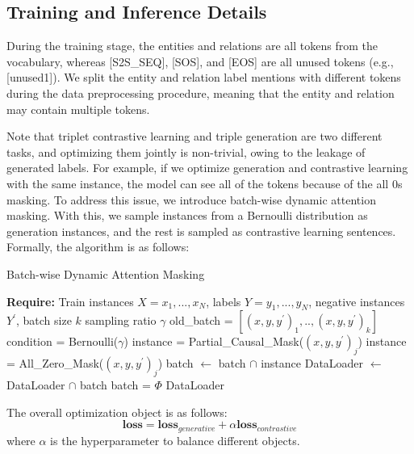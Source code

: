 \documentclass[letterpaper]{article} \usepackage{aaai21}  \usepackage{times}  \usepackage{helvet} \usepackage{courier}  \usepackage[hyphens]{url}  \usepackage{graphicx} \urlstyle{rm} \def\UrlFont{\rm}  \usepackage{natbib}  \usepackage[noend]{algpseudocode}
\begin{document}
\subsection{Training and Inference Details}

During the training stage, the entities and relations are all tokens from the vocabulary, whereas [S2S\_SEQ], [SOS], and [EOS] are all unused tokens (e.g., [unused1]). We split the entity and relation label mentions with different tokens during the data preprocessing procedure, meaning that the entity and relation may contain multiple tokens. 

Note that triplet contrastive learning and triple generation are two different tasks, and optimizing them jointly is non-trivial, owing to the leakage of generated labels. For example, if we optimize generation and contrastive learning with the same instance, the model can see all of the tokens because of the all $0$s masking. To address this issue, we introduce batch-wise dynamic attention masking. With this, we sample instances from a Bernoulli distribution as generation instances, and the rest is sampled as contrastive learning sentences. Formally, the algorithm is as follows:

\begin{algorithm}[th]
\begin{algorithmic}[1]
\caption{Batch-wise  Dynamic  Attention Masking} 
 \State \textbf{Require:} Train instances $X={x_1,...,x_N}$, labels $Y={y_1,...,y_N}$, negative instances $Y^{\prime}$,  batch size $k$ sampling ratio $\gamma$
   \State old\_batch = $[(x,y,y^{\prime})_1,..,(x,y,y^{\prime})_k]$
    \State condition = Bernoulli($\gamma$)
    \State    instance = Partial\_Causal\_Mask($(x,y,y^{\prime})_j$)
     \Else
     \State   instance = All\_Zero\_Mask($(x,y,y^{\prime})_j$)
    \EndIf
    \State batch $\leftarrow$ batch $\cap$  instance
    \EndFor
    \State DataLoader  $\leftarrow$ DataLoader $\cap$  batch
    \State batch = $\Phi$
   \EndWhile
   \Return DataLoader
\label{batch} 
\end{algorithmic}
\end{algorithm}
The overall optimization object is as follows:
\begin{equation}
    \mathbf{loss} = \mathbf{loss}_{generative} + \alpha \mathbf{loss}_{contrastive}
\end{equation}
where $\alpha$ is the hyperparameter to balance different objects. 
\end{document}
